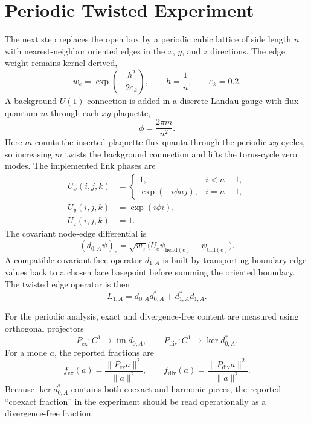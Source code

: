 \documentclass[11pt]{article}
\begin{document}
\section{Periodic Twisted Experiment}
The next step replaces the open box by a periodic cubic lattice of side length $n$ with nearest-neighbor oriented edges in the $x$, $y$, and $z$ directions. The edge weight remains kernel derived,
\begin{equation}
w_e = \exp\!\left(-\frac{h^2}{2\varepsilon_k}\right),
\qquad
h = \frac{1}{n},
\qquad
\varepsilon_k = 0.2.
\end{equation}
A background $U(1)$ connection is added in a discrete Landau gauge with flux quantum $m$ through each $xy$ plaquette,
\begin{equation}
\phi = \frac{2\pi m}{n^2}.
\end{equation}
Here $m$ counts the inserted plaquette-flux quanta through the periodic $xy$ cycles, so increasing $m$ twists the background connection and lifts the torus-cycle zero modes.
The implemented link phases are
\begin{align}
U_x(i,j,k) &=
\begin{cases}
1, & i < n-1, \\
\exp(-i\phi n j), & i = n-1,
\end{cases} \\
U_y(i,j,k) &= \exp(i\phi i), \\
U_z(i,j,k) &= 1.
\end{align}
The covariant node-edge differential is
\begin{equation}
(d_{0,A}\psi)_e = \sqrt{w_e}\bigl(U_e\psi_{\mathrm{head}(e)} - \psi_{\mathrm{tail}(e)}\bigr).
\end{equation}
A compatible covariant face operator $d_{1,A}$ is built by transporting boundary edge values back to a chosen face basepoint before summing the oriented boundary. The twisted edge operator is then
\begin{equation}
L_{1,A} = d_{0,A} d_{0,A}^* + d_{1,A}^* d_{1,A}.
\end{equation}

For the periodic analysis, exact and divergence-free content are measured using orthogonal projectors
\begin{equation}
P_{\mathrm{ex}} : C^1 \to \operatorname{im} d_{0,A},
\qquad
P_{\mathrm{div}} : C^1 \to \ker d_{0,A}^*.
\end{equation}
For a mode $a$, the reported fractions are
\begin{equation}
f_{\mathrm{ex}}(a) = \frac{\|P_{\mathrm{ex}} a\|^2}{\|a\|^2},
\qquad
f_{\mathrm{div}}(a) = \frac{\|P_{\mathrm{div}} a\|^2}{\|a\|^2}.
\end{equation}
Because $\ker d_{0,A}^*$ contains both coexact and harmonic pieces, the reported ``coexact fraction'' in the experiment should be read operationally as a divergence-free fraction.
\end{document}
